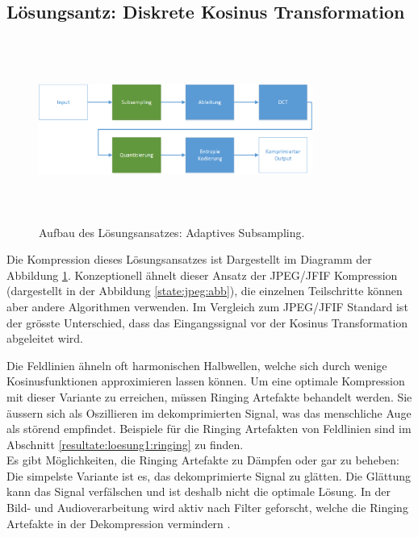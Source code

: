 \subsection{Lösungsantz: Diskrete Kosinus Transformation}\label{konzept:loesung1}
\begin{figure}[!htbp]
	\center
	\includegraphics[width=0.8\textwidth,height=6cm,keepaspectratio]{./pictures/konzept/solution1/aufbau.png}
	\caption{Aufbau des Lösungsansatzes: Adaptives Subsampling.}
	\label{konzept:loesung1:aufbau}
\end{figure} 
Die Kompression dieses Lösungsansatzes ist Dargestellt im Diagramm der Abbildung \ref{konzept:loesung1:aufbau}. Konzeptionell ähnelt dieser Ansatz der JPEG/JFIF Kompression (dargestellt in der Abbildung \ref{state:jpeg:abb}), die einzelnen Teilschritte können aber andere Algorithmen verwenden. Im Vergleich zum JPEG/JFIF Standard ist der grösste Unterschied, dass das Eingangssignal vor der Kosinus Transformation abgeleitet wird.

Die Feldlinien ähneln oft harmonischen Halbwellen, welche sich durch wenige Kosinusfunktionen approximieren lassen können. Um eine optimale Kompression mit dieser Variante zu erreichen, müssen Ringing Artefakte \cite{wiki:ringing:artefacts} behandelt werden. Sie äussern sich als Oszillieren im dekomprimierten Signal, was das menschliche Auge als störend empfindet. Beispiele für die Ringing Artefakten von Feldlinien sind im Abschnitt \ref{resultate:loesung1:ringing} zu finden.\\
Es gibt Möglichkeiten, die Ringing Artefakte zu Dämpfen oder gar zu beheben: Die simpelste Variante ist es, das dekomprimierte Signal zu glätten. Die Glättung kann das Signal verfälschen und ist deshalb nicht die optimale Lösung. In der Bild- und Audioverarbeitung wird aktiv nach Filter geforscht, welche die Ringing Artefakte in der Dekompression vermindern \cite{kaup1998reduction} \cite{park1999postprocessing}.

